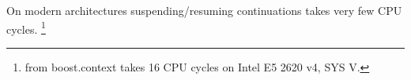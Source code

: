 
On modern architectures suspending/resuming continuations takes very few CPU cycles.
\footnote{ from boost.context takes 16 CPU cycles on Intel E5 2620 v4,
SYS V.}

